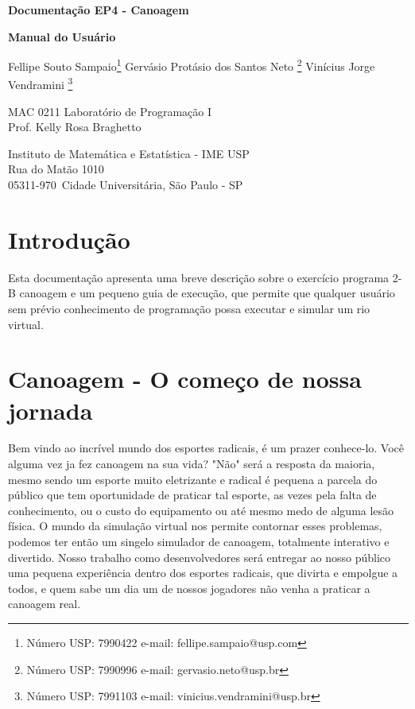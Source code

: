 \documentclass[a4paper,11pt]{article}
\begin{document}
\begin{center}{\Large \bf Documenta\c{c}ão EP4 - Canoagem \\ }\end{center}
\begin{center}{\Large \bf Manual do Usuário\\ }\end{center}

\begin{center}
{
Fellipe Souto Sampaio\footnote{Número USP: 7990422 e-mail: fellipe.sampaio@usp.com}
Gervásio Protásio dos Santos Neto \footnote{Número USP: 7990996 e-mail: gervasio.neto@usp.br}
Vinícius Jorge Vendramini \footnote{Número USP: 7991103 e-mail: vinicius.vendramini@usp.br}
}

\end{center}

\begin{center}
MAC 0211 Laboratório de Programa\c{c}ão I \\
Prof. Kelly Rosa Braghetto \\
             
\end{center}

\begin{center}
Instituto de Matemática e Estatística - IME USP \\
 Rua do Matão 1010 \\
 05311-970\, Cidade Universitária, São Paulo - SP \\
\end{center}

\newpage

\section{Introdu\c{c}ão}
Esta documenta\c{c}ão apresenta uma breve descri\c{c}ão sobre o exercício programa 2-B canoagem e um pequeno guia de execu\c{c}ão, que permite que qualquer usuário sem prévio conhecimento de programa\c{c}ão possa executar e simular um rio virtual.

\section{Canoagem - O come\c{c}o de nossa jornada}
Bem vindo ao incrível mundo dos esportes radicais, é um prazer conhece-lo. Você alguma vez ja fez canoagem na sua vida? "Não" será a resposta da maioria, mesmo sendo um esporte muito eletrizante e radical é pequena a parcela do público que tem oportunidade de praticar tal esporte, as vezes pela falta de conhecimento, ou o custo do equipamento ou até mesmo medo de alguma lesão física.
O mundo da simula\c{c}ão virtual nos permite contornar esses problemas, podemos ter então um singelo simulador de canoagem, totalmente interativo e divertido. Nosso trabalho como desenvolvedores será entregar ao nosso público uma pequena experiência dentro dos esportes radicais, que divirta e empolgue a todos, e quem sabe um dia um de nossos jogadores não venha a praticar a canoagem real.
\end{document}
